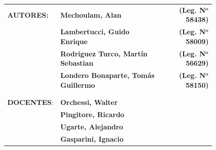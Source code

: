 \begin{titlepage}
\begin{figure}[H]
\begin{adjustwidth}{-1cm}{}
\begin{tabular}{llr} 
	\textbf{AUTORES:} & \textbf{Mechoulam, Alan}  &  \textbf{(Leg. N}$\mathbf{^o}$ \textbf{58438)}\\
	 & \textbf{Lambertucci, Guido Enrique} & \textbf{(Leg. N}$\mathbf{^o}$ \textbf{58009)} \\
	 & \textbf{Rodriguez Turco, Martín Sebastian} & \textbf{(Leg. N}$\mathbf{^o}$ \textbf{56629)} \\
	 & \textbf{Londero Bonaparte, Tomás Guillermo} & \textbf{(Leg. N}$\mathbf{^o}$ \textbf{58150)} \\
 &  & \\
 &  & \\
	\textbf{DOCENTES}: & \textbf{Orchessi, Walter} & \\
	 & \textbf{Pingitore, Ricardo} & \\
	 & \textbf{Ugarte, Alejandro} & \\
	 & \textbf{Gasparini, Ignacio} & \\
\end{tabular}
\end{adjustwidth}
\end{figure}

\vspace*{0.5cm}
{\noindent {}}
\vspace*{1.5cm}



\end{titlepage}
